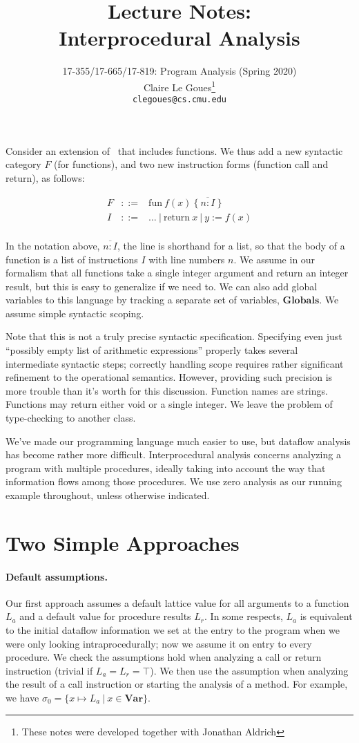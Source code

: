 \documentclass[11pt]{article}
\title{Lecture Notes:\\
		Interprocedural Analysis}
\author{17-355/17-665/17-819: Program Analysis (Spring 2020)\\
        Claire Le Goues\footnote{These notes were developed together with Jonathan Aldrich}\\
		{\tt clegoues@cs.cmu.edu}}
\date{}
\begin{document}
\maketitle


Consider an extension of \WhileThAddr\ that includes functions.  We thus add a new syntactic category $F$ (for functions), and two new instruction forms (function call and return), as follows:

\[
\begin{array}{llllll}
F & ::= & \mbox{fun}~f ( x )~\{~ \overline{n : I} ~\} \\
I & ::= & \ldots~| ~\mbox{return}~x~ | ~ y := f(x) \\
\end{array}
\]

In the notation above, $\overline{n : I}$, the line is shorthand for a list, so that the body of a function is a list of instructions $I$ with line numbers $n$.  We assume in our formalism that all functions take a single integer argument and return an integer result, but this is easy to generalize if we need to.
%
We can also add global variables to this language by tracking a separate set of variables, $\mathbf{Globals}$.  We assume simple syntactic scoping.

Note that this is not a truly precise syntactic specification.  Specifying even just ``possibly empty list of arithmetic expressions'' properly takes several intermediate syntactic steps; correctly handling scope requires rather significant refinement to the operational semantics.  However, providing such precision is more trouble than it's worth for this discussion.  Function names are strings.  Functions may return either void or a single integer.  We leave the problem of type-checking to another class.

We've made our programming language much easier to use, but dataflow analysis has become rather more difficult.   Interprocedural analysis concerns analyzing a program with multiple procedures, ideally taking into account the way that information flows among those procedures.  We use zero analysis as our running example throughout, unless otherwise indicated.

\section{Two Simple Approaches}

\paragraph{Default assumptions.}
Our first approach assumes a default lattice value for all arguments to a function $L_{a}$ and a default value for procedure results $L_{r}$.  In some respects, $L_{a}$ is equivalent to the initial dataflow information we set at the entry to the program when we were only looking intraprocedurally; now we assume it on entry to every procedure.  We check the assumptions hold when analyzing a call or return instruction (trivial if $L_{a} = L_{r} = \top$). We then use the assumption when analyzing the result of a call instruction or starting the analysis of a method.  For example, we have $\sigma_0 = \{ x \mapsto L_{a} ~|~ x \in \mathbf{Var}\}$.
\end{document}
